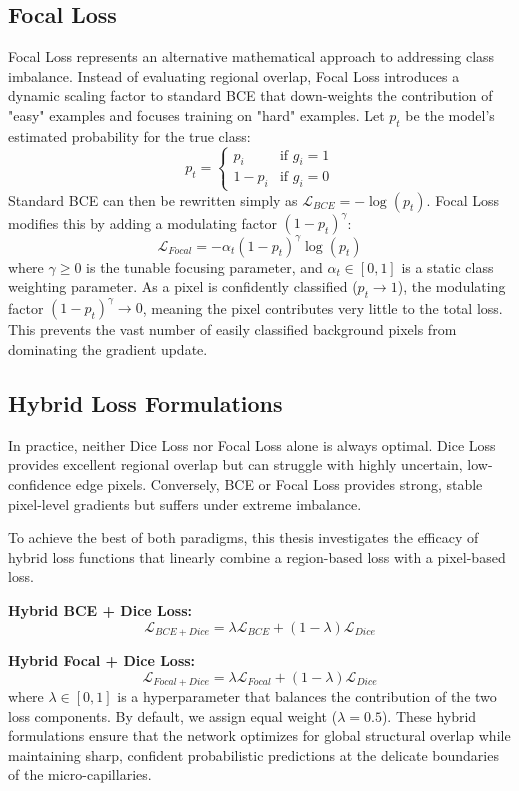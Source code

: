 \subsection{Focal Loss}
Focal Loss \parencite{lin2017focal} represents an alternative mathematical approach to addressing class imbalance. Instead of evaluating regional overlap, Focal Loss introduces a dynamic scaling factor to standard BCE that down-weights the contribution of "easy" examples and focuses training on "hard" examples. Let $p_t$ be the model's estimated probability for the true class:
\begin{equation}
    p_t = \begin{cases} 
        p_i & \text{if } g_i = 1 \\
        1 - p_i & \text{if } g_i = 0 
    \end{cases}
\end{equation}
Standard BCE can then be rewritten simply as $\mathcal{L}_{BCE} = -\log(p_t)$. Focal Loss modifies this by adding a modulating factor $(1 - p_t)^\gamma$:
\begin{equation}
    \mathcal{L}_{Focal} = - \alpha_t (1 - p_t)^\gamma \log(p_t)
\end{equation}
where $\gamma \ge 0$ is the tunable focusing parameter, and $\alpha_t \in [0, 1]$ is a static class weighting parameter. As a pixel is confidently classified ($p_t \rightarrow 1$), the modulating factor $(1 - p_t)^\gamma \rightarrow 0$, meaning the pixel contributes very little to the total loss. This prevents the vast number of easily classified background pixels from dominating the gradient update.

\subsection{Hybrid Loss Formulations}
In practice, neither Dice Loss nor Focal Loss alone is always optimal. Dice Loss provides excellent regional overlap but can struggle with highly uncertain, low-confidence edge pixels. Conversely, BCE or Focal Loss provides strong, stable pixel-level gradients but suffers under extreme imbalance. 

To achieve the best of both paradigms, this thesis investigates the efficacy of hybrid loss functions that linearly combine a region-based loss with a pixel-based loss.

\textbf{Hybrid BCE + Dice Loss:}
\begin{equation}
    \mathcal{L}_{BCE+Dice} = \lambda \mathcal{L}_{BCE} + (1 - \lambda) \mathcal{L}_{Dice}
\end{equation}

\textbf{Hybrid Focal + Dice Loss:}
\begin{equation}
    \mathcal{L}_{Focal+Dice} = \lambda \mathcal{L}_{Focal} + (1 - \lambda) \mathcal{L}_{Dice}
\end{equation}
where $\lambda \in [0,1]$ is a hyperparameter that balances the contribution of the two loss components. By default, we assign equal weight ($\lambda = 0.5$). These hybrid formulations ensure that the network optimizes for global structural overlap while maintaining sharp, confident probabilistic predictions at the delicate boundaries of the micro-capillaries.
